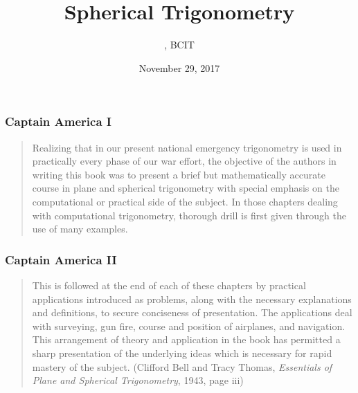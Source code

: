 \documentclass[xcolor=dvipsnames]{beamer}
\title{Spherical Trigonometry}
\subtitle{{\CourseNumber}, BCIT}
\author{\CourseName}
\date{November 29, 2017}
\begin{document}
\begin{frame}
  \titlepage
\end{frame}

\begin{frame}
  \frametitle{Captain America I}
  \begin{quote}
    Realizing that in our present national emergency trigonometry is
    used in practically every phase of our war effort, the objective
    of the authors in writing this book was to present a brief but
    mathematically accurate course in plane and spherical trigonometry
    with special emphasis on the computational or practical side of
    the subject. In those chapters dealing with computational
    trigonometry, thorough drill is first given through the use of
    many examples.
  \end{quote}
\end{frame}

\begin{frame}
  \frametitle{Captain America II}
  \begin{quote}
    This is followed at the end of each of these chapters by practical
    applications introduced as problems, along with the necessary
    explanations and definitions, to secure conciseness of
    presentation. The applications deal with surveying, gun fire,
    course and position of airplanes, and navigation. This arrangement
    of theory and application in the book has permitted a sharp
    presentation of the underlying ideas which is necessary for rapid
    mastery of the subject. (Clifford Bell and Tracy Thomas,
    \emph{Essentials of Plane and Spherical Trigonometry}, 1943, page
    iii)
  \end{quote}
\end{frame}
\end{document}
